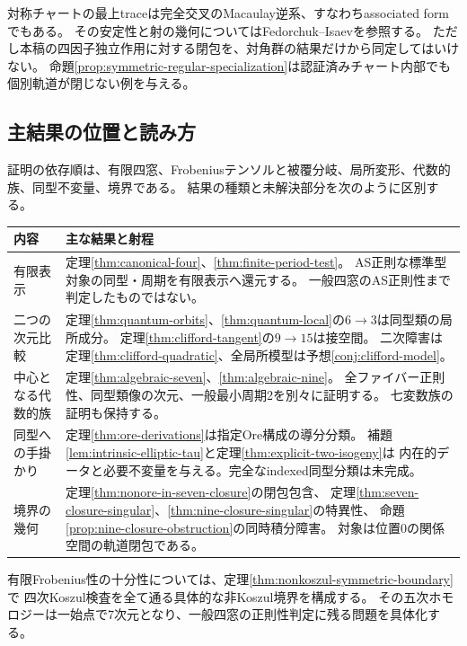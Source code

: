 \documentclass[11pt,a4paper]{ltjsarticle}
\theoremstyle{definition}
\begin{document}
対称チャートの最上traceは完全交叉のMacaulay逆系、すなわちassociated formでもある。
その安定性と射の幾何についてはFedorchuk--Isaev\cite{FIstability,FIassociated}を参照する。
ただし本稿の四因子独立作用に対する閉包を、対角群の結果だけから同定してはいけない。
命題\ref{prop:symmetric-regular-specialization}は認証済みチャート内部でも個別軌道が閉じない例を与える。

\subsection*{主結果の位置と読み方}
証明の依存順は、有限四窓、Frobeniusテンソルと被覆分岐、局所変形、代数的族、同型不変量、境界である。
結果の種類と未解決部分を次のように区別する。
\begin{longtable}{p{.24\linewidth}p{.69\linewidth}}
\toprule
内容 & 主な結果と射程\\
\midrule
\endhead
有限表示 &
定理\ref{thm:canonical-four}、\ref{thm:finite-period-test}。
AS正則な標準型対象の同型・周期を有限表示へ還元する。
一般四窓のAS正則性まで判定したものではない。\\
二つの次元比較 &
定理\ref{thm:quantum-orbits}、\ref{thm:quantum-local}の$6\to3$は同型類の局所成分。
定理\ref{thm:clifford-tangent}の$9\to15$は接空間。
二次障害は定理\ref{thm:clifford-quadratic}、全局所模型は予想\ref{conj:clifford-model}。\\
中心となる代数的族 &
定理\ref{thm:algebraic-seven}、\ref{thm:algebraic-nine}。
全ファイバー正則性、同型類像の次元、一般最小周期2を別々に証明する。
七変数族の証明も保持する。\\
同型への手掛かり &
定理\ref{thm:ore-derivations}は指定Ore構成の導分分類。
補題\ref{lem:intrinsic-elliptic-tau}と定理\ref{thm:explicit-two-isogeny}は
内在的データと必要不変量を与える。完全なindexed同型分類は未完成。\\
境界の幾何 &
定理\ref{thm:nonore-in-seven-closure}の閉包包含、
定理\ref{thm:seven-closure-singular}、\ref{thm:nine-closure-singular}の特異性、
命題\ref{prop:nine-closure-obstruction}の同時積分障害。
対象は位置0の関係空間の軌道閉包である。\\
\bottomrule
\end{longtable}

有限Frobenius性の十分性については、定理\ref{thm:nonkoszul-symmetric-boundary}で
四次Koszul検査を全て通る具体的な非Koszul境界を構成する。
その五次ホモロジーは一始点で7次元となり、一般四窓の正則性判定に残る問題を具体化する。
\end{document}
